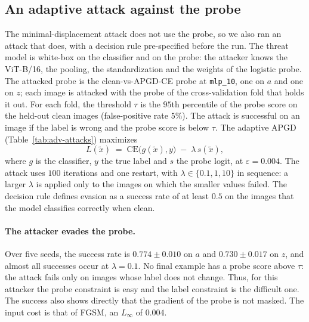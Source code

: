 \documentclass[../ppgc-tese.tex]{subfiles}
\begin{document}
\subsection{An adaptive attack against the probe}
\label{sec:adv-adaptive}
The minimal-displacement attack does not use the probe, so we also ran an
attack that does, with a decision rule pre-specified before the run.
The threat model is white-box on the classifier and on the probe: the attacker
knows the ViT-B/16, the pooling, the standardization and the weights of the
logistic probe. The attacked probe is the clean-vs-APGD-CE probe at
\texttt{mlp\_10}, one on $a$ and one on $z$; each image is attacked with the
probe of the cross-validation fold that holds it out. For each fold, the
threshold $\tau$ is the $95$th percentile of the probe score on the held-out
clean images (false-positive rate $5\%$). The attack is successful on an image
if the label is wrong and the probe score is below $\tau$. The adaptive APGD
(Table~\ref{tab:adv-attacks}) maximizes
\begin{equation}
  L(\tilde{x}) \;=\; \mathrm{CE}\bigl(g(\tilde{x}), y\bigr) \;-\; \lambda\, s(\tilde{x}),
  \label{eq:adv-adaptive}
\end{equation}
where $g$ is the classifier, $y$ the true label and $s$ the probe logit, at
$\varepsilon{=}0.004$. The attack uses $100$ iterations and one restart, with
$\lambda\in\{0.1, 1, 10\}$ in sequence: a larger $\lambda$ is applied only to
the images on which the smaller values failed. The decision rule defines
evasion as a success rate of at least $0.5$ on the images that the model
classifies correctly when clean.

\paragraph*{The attacker evades the probe.}
Over five seeds, the success rate is $0.774\pm0.010$ on $a$ and
$0.730\pm0.017$ on $z$, and almost all successes occur at $\lambda=0.1$.
No final example has a probe score above $\tau$: the attack fails only on
images whose label does not change.
Thus, for this attacker the probe constraint is easy and the label constraint
is the difficult one. The success also shows directly that the gradient of the
probe is not masked. The input cost is that of FGSM, an $L_\infty$ of $0.004$.
\end{document}
